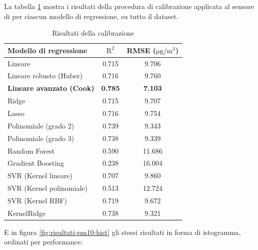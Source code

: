 La tabella \ref{fig:risultati-pm10} mostra i risultati della procedura di calibrazione applicata al sensore di  per ciascun modello di regressione, su tutto il dataset.

\begin{table}[H]
    \footnotesize
    \centering
    \begin{tabular}{|l|c|c|}
    \hline
        \textbf{Modello di regressione} & $\bm{\mathrm{R^2}}$ & \textbf{RMSE (}$\mathrm{\si{\micro}g/m^3}$) \\ \hline
        Lineare & 0.715 & 9.706 \\ \hline
        Lineare robusto (Huber) & 0.716 & 9.760 \\ \hline
        \textbf{Lineare avanzato (Cook)} & \textbf{0.785} & \textbf{7.103} \\ \hline
        Ridge & 0.715 & 9.707 \\ \hline
        Lasso & 0.716 & 9.754 \\ \hline
        Polinomiale (grado 2) & 0.739 & 9.343 \\ \hline
        Polinomiale (grado 3) & 0.738 & 9.339 \\ \hline
        Random Forest & 0.590 & 11.686 \\ \hline
        Gradient Boosting & 0.238 & 16.004 \\ \hline
        SVR (Kernel lineare) & 0.707 & 9.860 \\ \hline
        SVR (Kernel polinomiale) & 0.513 & 12.724 \\ \hline
        SVR (Kernel RBF) & 0.719 & 9.672 \\ \hline
        KernelRidge & 0.738 & 9.321 \\ \hline
    \end{tabular}
    \captionsetup{justification=centering}
    \caption{Risultati della calibrazione }
    \label{fig:risultati-pm10}
\end{table}

E in figura \ref{fig:risultati-pm10-hist} gli stessi risultati in forma di istogramma, ordinati per performance:

